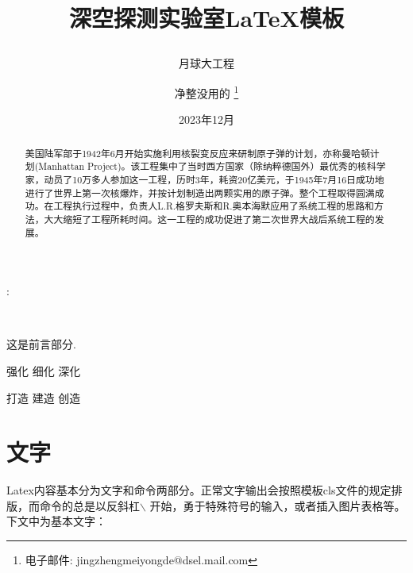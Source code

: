\documentclass[a4paper, 10pt]{dselReport}
\begin{document}
\title{深空探测实验室\LaTeX 模板 \\ \subtitle{月球大工程} }



\author{净整没用的
\footnote{电子邮件: jingzhengmeiyongde@dsel.mail.com}\\[4ex]
}
\date{2023年12月}




\maketitle

\newpage
\thispagestyle {empty}  %
\mbox{}
\newpage

\newpage
\begin{abstract}
美国陆军部于1942年6月开始实施利用核裂变反应来研制原子弹的计划，亦称曼哈顿计划(Manhattan Project)。该工程集中了当时西方国家（除纳粹德国外）最优秀的核科学家，动员了10万多人参加这一工程，历时3年，耗资20亿美元，于1945年7月16日成功地进行了世界上第一次核爆炸，并按计划制造出两颗实用的原子弹。整个工程取得圆满成功。在工程执行过程中，负责人L.R.格罗夫斯和R.奥本海默应用了系统工程的思路和方法，大大缩短了工程所耗时间。这一工程的成功促进了第二次世界大战后系统工程的发展。
\end{abstract}

{\hei\sihao {}:} \avicitCKeyword


\newpage
\setcounter{page}{1}

\begin{center}
    \sanhao{}
\end{center}~\

这是前言部分.

强化 细化 深化

打造 建造 创造 

\newpage


\newpage
\begin{center}
\tableofcontents
\end{center}
\newpage

\section{文字}
Latex内容基本分为文字和命令两部分。正常文字输出会按照模板cls文件的规定排版，而命令的总是以反斜杠$\backslash$ 开始，勇于特殊符号的输入，或者插入图片表格等。下文中为基本文字： 
\end{document}

